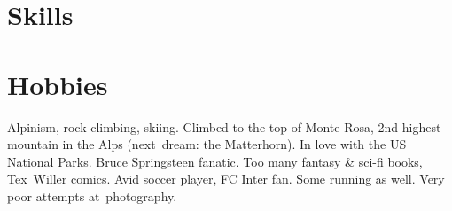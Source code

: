\vspace{-0.32cm}

\section{Skills}

\vspace{-0.32cm}
\section{Hobbies}
Alpinism, rock climbing, skiing. Climbed to the top of Monte Rosa, 2nd highest mountain in the Alps (next~dream: the Matterhorn). In love with the US National Parks. Bruce Springsteen fanatic.  Too many fantasy \& sci-fi books, Tex~Willer comics. Avid soccer player, FC Inter fan. Some running as well. Very poor attempts at~photography.

%


